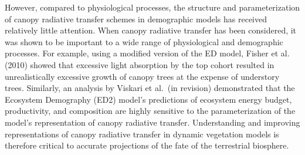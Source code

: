 However, compared to physiological processes, the structure and parameterization of canopy radiative transfer schemes in demographic models has received relatively little attention.
When canopy radiative transfer has been considered, it was shown to be important to a wide range of physiological and demographic processes.
For example, using a modified version of the ED model, Fisher et al. (2010)\nocite{fisher_2010_assessing} showed that excessive light absorption by the top cohort resulted in unrealistically excessive growth of canopy trees at the expense of understory trees.
Similarly, an analysis by Viskari et al.\ (in revision) \nocite{viskari_2019_influence} demonstrated that the Ecosystem Demography (ED2) model's predictions of ecosystem energy budget, productivity, and composition are highly sensitive to the parameterization of the model's representation of canopy radiative transfer.
Understanding and improving representations of canopy radiative transfer in dynamic vegetation models is therefore critical to accurate projections of the fate of the terrestrial biosphere.
